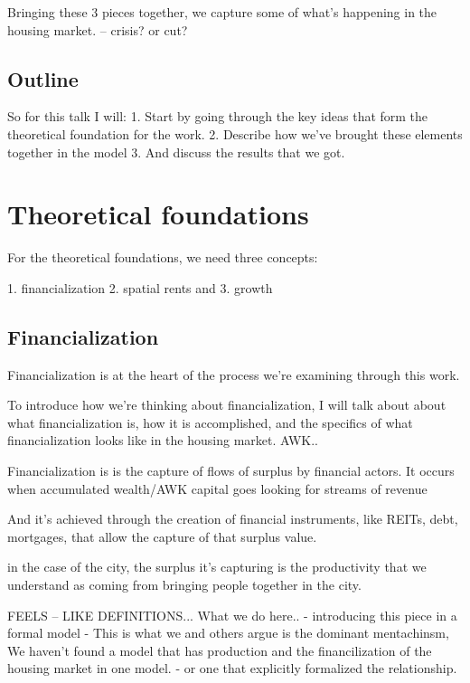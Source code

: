 \documentclass[]{article}
\begin{document}
Bringing these 3 pieces together, we capture some of what's happening in the housing market. -- crisis? or cut?

\subsection{Outline}
So for this talk I will: 
1. Start by going through the key ideas that form the theoretical foundation for the work.
2. Describe how we've brought these elements together in the model 
3. And discuss the results that we got.

\section{Theoretical foundations}
For the theoretical foundations, we need three concepts: 

1. financialization
2. spatial rents and
3. growth

\subsection{Financialization}
Financialization is at the heart of the process we're examining through this work. 

To introduce how we're thinking about financialization, I will talk about about what financialization is, how it is accomplished, and the specifics of what financialization looks like in the housing market. AWK.. 


Financialization is is the capture of flows of surplus by financial actors. 
It occurs when %
accumulated wealth/AWK capital goes looking for streams of revenue 


And it's achieved through the creation of financial instruments, like REITs, debt, mortgages,  that allow the capture of that surplus value.

in the case of the city, the surplus it's capturing is the productivity that we understand as coming from bringing people together in the city. 

FEELS -- LIKE DEFINITIONS... 
What we do here.. - introducing this piece in a formal model - This is what we and others argue is the dominant mentachinsm,  We haven't found a model that has production and the financilization of the housing market in one model. - or one that explicitly formalized the relationship. 
\end{document}
